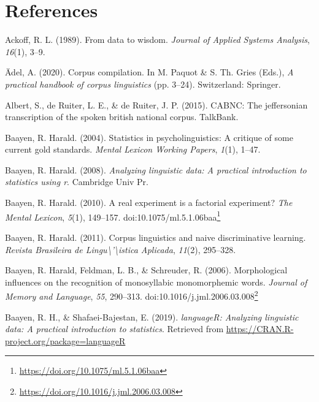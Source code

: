 \documentclass[
  letterpaper,
]{book}
\newlength{\cslhangindent}
\newenvironment{CSLReferences}[2] %
 {\begin{list}{}{%
  \setlength{\itemindent}{0pt}
  \setlength{\leftmargin}{0pt}
  \setlength{\parsep}{0pt}
  \ifodd #1
   \setlength{\leftmargin}{\cslhangindent}
   \setlength{\itemindent}{-1\cslhangindent}
  \fi
  \setlength{\itemsep}{#2\baselineskip}}}
 {\end{list}}
\theoremstyle{definition}
\theoremstyle{remark}
\DeclareRobustCommand{\href}[2]{#2\footnote{\url{#1}}}
\begin{document}

\chapter*{References}\label{references}


\label{refs}
\begin{CSLReferences}{1}{0}
Ackoff, R. L. (1989). From data to wisdom. \emph{Journal of Applied
Systems Analysis}, \emph{16}(1), 3--9.

Ädel, A. (2020). Corpus compilation. In M. Paquot \& S. Th. Gries
(Eds.), \emph{A practical handbook of corpus linguistics} (pp. 3--24).
Switzerland: Springer.

Albert, S., de Ruiter, L. E., \& de Ruiter, J. P. (2015). CABNC: The
jeffersonian transcription of the spoken british national corpus.
TalkBank.

Baayen, R. Harald. (2004). Statistics in psycholinguistics: A critique
of some current gold standards. \emph{Mental Lexicon Working Papers},
\emph{1}(1), 1--47.

Baayen, R. Harald. (2008). \emph{Analyzing linguistic data: A practical
introduction to statistics using r}. Cambridge Univ Pr.

Baayen, R. Harald. (2010). A real experiment is a factorial experiment?
\emph{The Mental Lexicon}, \emph{5}(1), 149--157.
doi:\href{https://doi.org/10.1075/ml.5.1.06baa}{10.1075/ml.5.1.06baa}

Baayen, R. Harald. (2011). Corpus linguistics and naive discriminative
learning. \emph{Revista Brasileira de
Lingu{\textbackslash{}}'{\textbackslash{}}istica Aplicada},
\emph{11}(2), 295--328.

Baayen, R. Harald, Feldman, L. B., \& Schreuder, R. (2006).
Morphological influences on the recognition of monosyllabic
monomorphemic words. \emph{Journal of Memory and Language}, \emph{55},
290--313.
doi:\href{https://doi.org/10.1016/j.jml.2006.03.008}{10.1016/j.jml.2006.03.008}

Baayen, R. H., \& Shafaei-Bajestan, E. (2019). \emph{languageR:
Analyzing linguistic data: A practical introduction to statistics}.
Retrieved from \url{https://CRAN.R-project.org/package=languageR}


\end{CSLReferences}
\end{document}
